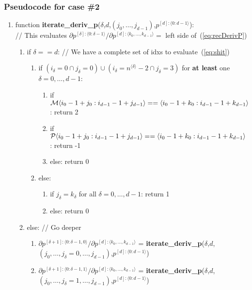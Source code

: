 \documentclass[11pt]{article}
\begin{document}

\subsubsection{Pseudocode for case \#2}


\begin{enumerate}
\item function \textbf{iterate\_deriv\_p}($\delta$,$d$,$(j_0, \dots, j_{d-1})$,$p^{[d]:\langle 0:d-1 \rangle}$): \\
// This evaluates $\partial p^{[\delta]:\langle 0: \delta -1 \rangle} / \partial p^{[d] : \langle k_0, \dots, k_{d-1} \rangle} = $ left side of~(\ref{eq:recDerivP})
\begin{enumerate}
\item if $\delta == d$: // We have a complete set of idxs to evaluate~(\ref{eq:shit})
\begin{enumerate}
\item if $(i_\delta=0 \cap j_\delta =0) \cup (i_\delta=n^{\langle \delta \rangle} -2 \cap j_\delta = 3)$ for \textbf{at least} one $\delta=0,\dots,d-1$:
\begin{enumerate}
\item if ${\cal M} \langle i_0 - 1 + j_0 : i_{d-1} - 1 + j_{d-1} \rangle == \langle i_0 - 1 + k_0 : i_{d-1} - 1 + k_{d-1} \rangle$: return 2
\item if ${\cal P} \langle i_0 - 1 + j_0 : i_{d-1} - 1 + j_{d-1} \rangle == \langle i_0 - 1 + k_0 : i_{d-1} - 1 + k_{d-1} \rangle$: return -1
\item else: return 0
\end{enumerate}
\item else:
\begin{enumerate}
\item if $j_\delta = k_\delta$ for all $\delta=0,\dots,d-1$: return 1
\item else: return 0
\end{enumerate}
\end{enumerate}
\item else: // Go deeper
\begin{enumerate}
\item $\partial p^{[\delta+1]:\langle 0: \delta-1, 0 \rangle} / \partial p^{[d] : \langle k_0, \dots, k_{d-1} \rangle}$ = \textbf{iterate\_deriv\_p}($\delta$,$d$,$(j_0, \dots, j_\delta=0, \dots, j_{d-1})$,$p^{[d]:\langle 0:d-1 \rangle}$)
\item $\partial p^{[\delta+1]:\langle 0: \delta-1, 1 \rangle} / \partial p^{[d] : \langle k_0, \dots, k_{d-1} \rangle}$ = \textbf{iterate\_deriv\_p}($\delta$,$d$,$(j_0, \dots, j_\delta=1, \dots, j_{d-1})$,$p^{[d]:\langle 0:d-1 \rangle}$)

\end{enumerate}
\end{enumerate}
\end{enumerate}
\end{document}
